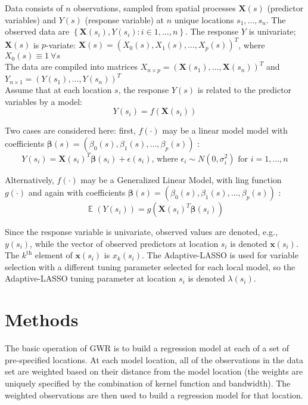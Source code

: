 \documentclass[10pt]{amsart}
\newcommand{\vect}[1]{\boldsymbol{#1}}
\newcommand{\E}{\mathop{\mathbb E}}
\begin{document}
	Data consists of $n$ observations, sampled from spatial processes $\vect{X}(s)$ (predictor variables) and $Y(s)$ (response variable) at $n$ unique locations $s_1, \dots, s_n$. The observed data are $\left\{ \vect{X}(s_i) , Y(s_i) : i \in 1, \dots, n \right\}$. The response $Y$ is univariate; $\vect{X}(s)$ is $p$-variate: $\vect{X}(s) = (X_0(s), X_1(s), \dots, X_p(s))^T$, where $X_0(s) \equiv 1 \: \forall s$ \\
	
	The data are compiled into matrices $X_{n \times p} = \left( \vect{X}(s_1), \dots, \vect{X}(s_n) \right)^T$ and $Y_{n \times 1} = \left(Y(s_1), \dots, Y(s_n) \right)^T$\\
		
	Assume that at each location $s$, the response $Y(s)$ is related to the predictor variables by a model:\\
	
	\[
		Y(s_i) = f \left(\vect{X}(s_i) \right) %
	\]
	
	Two cases are considered here: first, $f(\cdot)$ may be a linear model model with coefficients $\vect{\beta}(s) = (\beta_0(s), \beta_1(s), \dots, \beta_p(s))$ :\\
	\[
		Y(s_i) = \vect{X}(s_i)^T \vect{\beta}(s_i) + \epsilon(s_i) \text{, where } \epsilon_i \sim N\left( 0, \sigma_i^2 \right) \text{ for } i=1, \dots, n
	\]
	
	Alternatively, $f(\cdot)$ may be a Generalized Linear Model, with ling function $g(\cdot)$ and again with coefficients $\vect{\beta}(s) = (\beta_0(s), \beta_1(s), \dots, \beta_p(s))$ :\\
	\[
		\E \left( Y(s_i) \right) = g(\vect{X}(s_i)^T \vect{\beta}(s_i))
	\]
	
	Since the response variable is univariate, observed values are denoted, e.g., $y(s_i)$, while the vector of observed predictors at location $s_i$ is denoted $\vect{x}(s_i)$. The $k^{\text{th}}$ element of $\vect{x}(s_i)$ is $x_k(s_i)$. The Adaptive-LASSO is used for variable selection with a different tuning parameter selected for each local model, so the Adaptive-LASSO tuning parameter at location $s_i$ is denoted $\lambda(s_i)$.\\ 
	

\section{Methods}
	The basic operation of GWR is to build a regression model at each of a set of pre-specified locations. At each model location, all of the observations in the data set are weighted based on their distance from the model location (the weights are uniquely specified by the combination of kernel function and bandwidth). The weighted observations are then used to build a regression model for that location.\\
	
\end{document}
